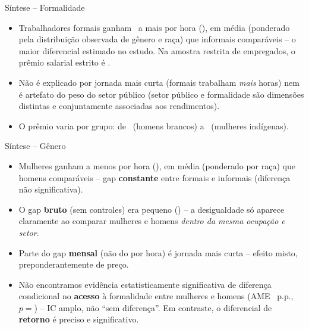 \documentclass[aspectratio=169]{beamer}
\newcommand{\highlight}[1]{\textcolor{accentblue}{\textbf{#1}}}
\newcommand{\negativo}[1]{\textcolor{accentred}{\textbf{#1}}}
\begin{document}
\begin{frame}{S\'intese -- Formalidade}
  \begin{itemize}
    \item Trabalhadores formais ganham \PctFormalGeralHoraAmpla\ a mais por hora (\ReaisFormalGeralHoraAmpla), em m\'edia (ponderado pela distribui\c{c}\~ao observada de g\^enero e ra\c{c}a) que informais compar\'aveis -- o maior diferencial estimado no estudo. Na amostra restrita de empregados, o pr\^emio salarial estrito \'e \PctFormalGeralHoraRestrita.
    \item N\~ao \'e explicado por jornada mais curta (formais trabalham \emph{mais} horas) nem \'e artefato do peso do setor p\'ublico (setor p\'ublico e formalidade s\~ao dimens\~oes distintas e conjuntamente associadas aos rendimentos).
    \item O pr\^emio varia por grupo: de \PctFormalHomemBranco\ (homens brancos) a \PctFormalMulherIndigena\ (mulheres ind\'igenas).
  \end{itemize}
\end{frame}

\begin{frame}{S\'intese -- G\^enero}
  \begin{itemize}
    \item Mulheres ganham \negativo{\PctGeneroInformal} a menos por hora (\ReaisGeneroInformal), em m\'edia (ponderado por ra\c{c}a) que homens compar\'aveis -- gap \highlight{constante} entre formais e informais (diferen\c{c}a n\~ao significativa).
    \item O gap \highlight{bruto} (sem controles) era pequeno (\BrutoGapMulherPct) -- a desigualdade s\'o aparece claramente ao comparar mulheres e homens \emph{dentro da mesma ocupa\c{c}\~ao e setor}.
    \item Parte do gap \highlight{mensal} (n\~ao do por hora) \'e jornada mais curta -- efeito misto, preponderantemente de pre\c{c}o.
    \item N\~ao encontramos evid\^encia estatisticamente significativa de diferen\c{c}a condicional no \highlight{acesso} \`a formalidade entre mulheres e homens (AME \AmePpMulherAmpla\ p.p., $p=$\PValorAmeMulherAmpla) -- IC amplo, n\~ao ``sem diferen\c{c}a''. Em contraste, o diferencial de \highlight{retorno} \'e preciso e significativo.
  \end{itemize}
\end{frame}
\end{document}
